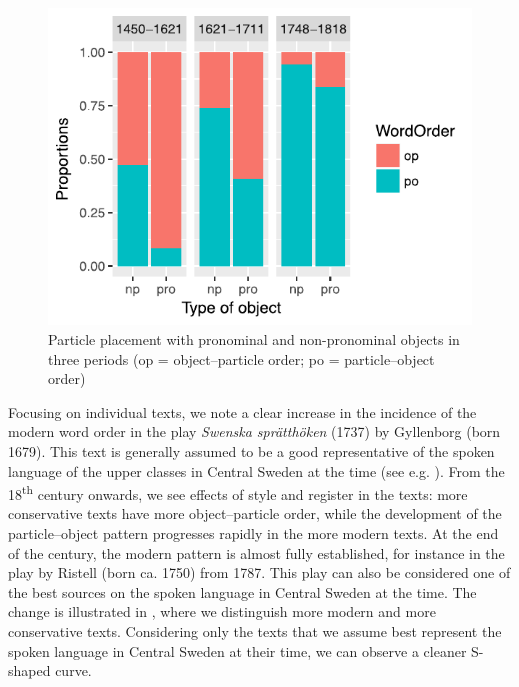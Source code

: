\documentclass[output=paper]{langscibook}
\begin{document}
  
\begin{figure}
\includegraphics[width=.75\textwidth]{figures/a4-img001.pdf}
\caption{Particle placement with pronominal and non-pronominal objects in three periods (op = object–particle order; po = particle–object order)\label{fig:lalu:1}} 
\end{figure}


Focusing on individual texts, we note a clear increase in the incidence of the modern word order in the play \textit{Swenska sprätthöken} (1737) by Gyllenborg (born 1679). This text is generally assumed to be a good representative of the spoken language of the upper classes in Central Sweden at the time (see e.g. \citealt{Widmark2000}). From the 18\textsuperscript{th} century onwards, we see effects of style and register in the texts: more conservative texts have more object–particle order, while the development of the particle–object pattern progresses rapidly in the more modern texts. At the end of the century, the modern pattern is almost fully established, for instance in the play by Ristell (born ca. 1750) from 1787. This play can also be considered one of the best sources on the spoken language in Central Sweden at the time. The change is illustrated in , where we distinguish more modern and more conservative texts. Considering only the texts that we assume best represent the spoken language in Central Sweden at their time, we can observe a cleaner S-shaped curve.
\end{document}
